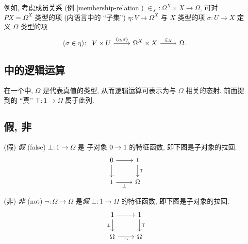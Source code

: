 例如, 考虑成员关系 (例 \ref{membership-relation}) ${\in_X} \colon \Omega^X\times X \to \Omega$,
可对 $PX=\Omega^X$ 类型的项 (内语言中的 ``子集'') $\eta\colon V \to \Omega^X$ 与 $X$ 类型的项 $\sigma\colon U\to X$ 定义 $\Omega$ 类型的项
\[
(\sigma \in \eta) \colon 
\begin{tikzcd}[ampersand replacement=\&]
	{V\times U} \& {\Omega^X\times X} \& \Omega.
	\arrow["{(\eta,\sigma)}", from=1-1, to=1-2]
	\arrow["{\in_X}", from=1-2, to=1-3]
\end{tikzcd}\]



\subsection{\topos{}中的逻辑运算}

在一个\topos{}中, $\Omega$ 是代表真值的类型, 从而逻辑运算可表示为与 $\Omega$ 相关的态射. 前面提到的 ``真'' $\top \colon 1 \to \Omega$ 属于此列.

\subsection{假, 非}

\begin{definition}
	{(假)}
	\emph{假} (false) $\bot \colon 1 \to \Omega$ 是 子对象 $0\to 1$ 的特征函数, 即下图是子对象的拉回.
	\[\begin{tikzcd}[ampersand replacement=\&]
		0 \& 1 \\
		1 \& \Omega
		\arrow[from=1-1, to=2-1]
		\arrow[from=1-1, to=1-2]
		\arrow["\bot"', from=2-1, to=2-2]
		\arrow["\top", from=1-2, to=2-2]
	\end{tikzcd}\]
\end{definition}

\begin{definition}
	{(非)}
	\emph{非} (not) $\neg\colon \Omega\to\Omega$ 是\emph{假} $\bot\colon 1 \to\Omega$ 的特征函数, 即下图是子对象的拉回.
	\[\begin{tikzcd}[ampersand replacement=\&]
		1 \& 1 \\
		\Omega \& \Omega
		\arrow["\bot"', from=1-1, to=2-1]
		\arrow[from=1-1, to=1-2]
		\arrow["\neg"', from=2-1, to=2-2]
		\arrow["\top", from=1-2, to=2-2]
	\end{tikzcd}\]
\end{definition}

